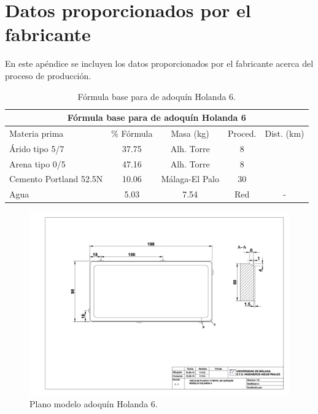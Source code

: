 \chapter{Datos proporcionados por el fabricante}\label{apend:datos}
En este apéndice se incluyen los datos proporcionados por el fabricante acerca del proceso de producción.

\begin{table}[!htb]
\centering
\begin{tabular}{lcccc}
\toprule
\multicolumn{5}{c}{Fórmula base para de adoquín Holanda 6}\\
\midrule
Materia prima & \% Fórmula & Masa (\si{kg}) & Proced. & Dist. (\si{km})\\
\midrule
Árido tipo 5/7 & 37.75 & Alh. Torre & 8\\
Arena tipo 0/5 & 47.16 & Alh. Torre & 8\\
Cemento Portland 52.5N & 10.06 & Málaga-El Palo & 30\\
Agua & 5.03 & 7.54 & Red & -\\
\bottomrule
\end{tabular}
\caption{Fórmula base para de adoquín Holanda 6.}
\label{formulabase}
\end{table}


\begin{figure}[!htb]
\centering
\includegraphics[width=15cm]{plano_adoquin.png}
\caption{Plano modelo adoquín Holanda 6.}
\label{fig:planoadoquin}
\end{figure}

